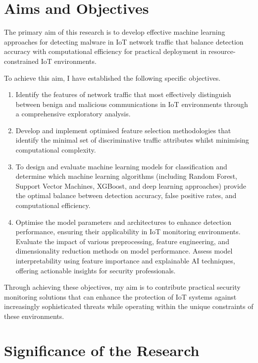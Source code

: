 \section{Aims and Objectives}

The primary aim of this research is to develop effective machine learning approaches for detecting malware in IoT network traffic that balance detection accuracy with computational efficiency for practical deployment in resource-constrained IoT environments.

To achieve this aim, I have established the following specific objectives.

\begin{enumerate}
    \item Identify the features of network traffic that most effectively distinguish between benign and malicious communications in IoT environments through a comprehensive exploratory analysis.
    
    \item Develop and implement optimised feature selection methodologies that identify the minimal set of discriminative traffic attributes whilst minimising computational complexity.
    
    \item To design and evaluate machine learning models for classification and determine which machine learning algorithms (including Random Forest, Support Vector Machines, XGBoost, and deep learning approaches) provide the optimal balance between detection accuracy, false positive rates, and computational efficiency.
    
    \item Optimise the model parameters and architectures to enhance detection performance, ensuring their applicability in IoT monitoring environments. Evaluate the impact of various preprocessing, feature engineering, and dimensionality reduction methods on model performance. Assess model interpretability using feature importance and explainable AI techniques, offering actionable insights for security professionals.
    
\end{enumerate}

Through achieving these objectives, my aim is to contribute practical security monitoring solutions that can enhance the protection of IoT systems against increasingly sophisticated threats while operating within the unique constraints of these environments.

\section{Significance of the Research}

